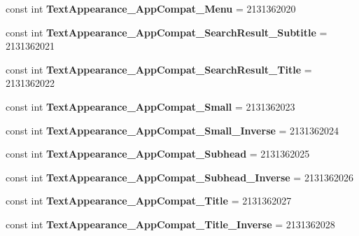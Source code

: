 \begin{DoxyCompactItemize}
const int {\bfseries Text\+Appearance\+\_\+\+App\+Compat\+\_\+\+Menu} = 2131362020
\item 
\mbox{\label{classXaria_1_1Resource_1_1Style_ab3d2251593b57d9f100770c0b5256782}} 
const int {\bfseries Text\+Appearance\+\_\+\+App\+Compat\+\_\+\+Search\+Result\+\_\+\+Subtitle} = 2131362021
\item 
\mbox{\label{classXaria_1_1Resource_1_1Style_ad39cd26d2652cb0ecdaedd8bc5c160de}} 
const int {\bfseries Text\+Appearance\+\_\+\+App\+Compat\+\_\+\+Search\+Result\+\_\+\+Title} = 2131362022
\item 
\mbox{\label{classXaria_1_1Resource_1_1Style_ab530b6862b8db5c5d1feea5a575deb33}} 
const int {\bfseries Text\+Appearance\+\_\+\+App\+Compat\+\_\+\+Small} = 2131362023
\item 
\mbox{\label{classXaria_1_1Resource_1_1Style_a56e77c2ec3f0e68be4dc6c2ae6dfaca0}} 
const int {\bfseries Text\+Appearance\+\_\+\+App\+Compat\+\_\+\+Small\+\_\+\+Inverse} = 2131362024
\item 
\mbox{\label{classXaria_1_1Resource_1_1Style_aa1afb7b9f0a8905e9c8534f34ee6794b}} 
const int {\bfseries Text\+Appearance\+\_\+\+App\+Compat\+\_\+\+Subhead} = 2131362025
\item 
\mbox{\label{classXaria_1_1Resource_1_1Style_abeb5429c91d5cd9150acf432559113a7}} 
const int {\bfseries Text\+Appearance\+\_\+\+App\+Compat\+\_\+\+Subhead\+\_\+\+Inverse} = 2131362026
\item 
\mbox{\label{classXaria_1_1Resource_1_1Style_a6238ccf4dcb581bb11726496bb9bb37f}} 
const int {\bfseries Text\+Appearance\+\_\+\+App\+Compat\+\_\+\+Title} = 2131362027
\item 
\mbox{\label{classXaria_1_1Resource_1_1Style_a76095930e8a49d63ce321bdcb35f838b}} 
const int {\bfseries Text\+Appearance\+\_\+\+App\+Compat\+\_\+\+Title\+\_\+\+Inverse} = 2131362028
\item 
\mbox{\label{classXaria_1_1Resource_1_1Style_a90ef0f7e788bf20ef07d2bb6b7b86065}} 

\end{DoxyCompactItemize}
